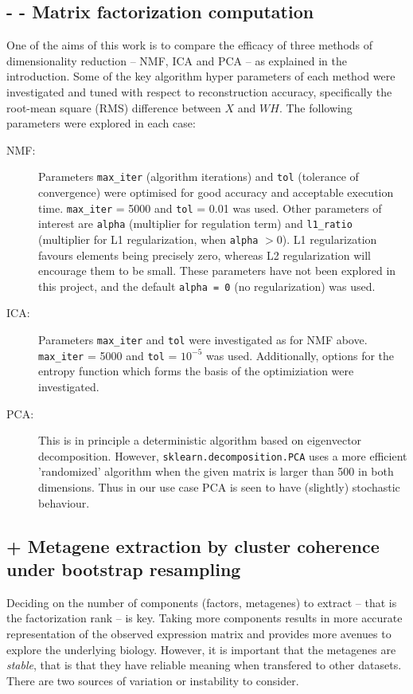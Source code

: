 \documentclass[tikz, 11pt,a4paper,oneside,fleqn, draft]{article}
\begin{document}
\subsection{- - Matrix factorization computation}
One of the aims of this work is to compare the efficacy of three methods of dimensionality reduction -- NMF, ICA and PCA -- as explained in the introduction.     
Some of the key algorithm hyper parameters of each method were investigated and tuned with respect to reconstruction accuracy, specifically the root-mean square (RMS) difference between $X$ and $W H$. The following parameters were explored in each case:
\begin{description}
\item[NMF:] Parameters {\tt max\_iter} (algorithm iterations) and {\tt tol} (tolerance of convergence) were optimised for good accuracy and acceptable execution time.   
{\tt max\_iter} = 5000 and {\tt tol} = 0.01 was used.
Other parameters of interest are {\tt alpha} (multiplier for regulation term) and {\tt l1\_ratio} (multiplier for L1 regularization, when {\tt alpha} $> 0$).  L1 regularization  favours elements being precisely zero, whereas L2 regularization will encourage them to be small.  These parameters have not been explored in this project, and the default {\tt alpha = 0} (no regularization) was used.
\item[ICA:]  Parameters {\tt max\_iter} and {\tt tol} were investigated as for NMF above. 
{\tt max\_iter} = 5000 and {\tt tol} = $10^{-5}$ was used.
Additionally, options for the entropy function which forms the basis of the optimiziation were investigated.
\item[PCA:] This is in principle a deterministic algorithm based on eigenvector decomposition.  However, {\tt sklearn.decomposition.PCA} uses a more efficient 'randomized' algorithm when the given matrix is larger than 500 in both dimensions.  Thus in our use case PCA is seen to have (slightly) stochastic behaviour.
\end{description}

\subsection{+ Metagene extraction by cluster coherence under bootstrap resampling}
\label{sec-metagene-selection}
Deciding on the number of components (factors, metagenes) to extract -- that is the factorization rank -- is key.  Taking more components results in more accurate representation of the observed expression matrix and provides more avenues to explore the underlying biology.  However, it is important that the metagenes are \emph{stable}, that is that they have reliable meaning when transfered to other datasets.   There are two sources of variation or instability to consider.
\end{document}
